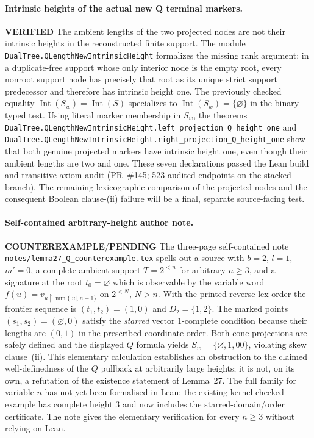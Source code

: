 \documentclass[11pt]{article}
\newcommand{\ok}{\textcolor{green!40!black}{\textbf{VERIFIED}}}
\newcommand{\bad}{\textcolor{red!70!black}{\textbf{COUNTEREXAMPLE}}}
\newcommand{\todo}{\textcolor{gray!70!black}{\textbf{PENDING}}}
\newcommand{\lean}[1]{\texttt{#1}}
\begin{document}
\paragraph{Intrinsic heights of the actual new Q terminal markers.} \ok
The ambient lengths of the two projected nodes are not their
intrinsic heights in the reconstructed finite support.
The module \lean{DualTree.QLengthNewIntrinsicHeight}
formalizes the missing rank argument: in a duplicate-free
support whose only interior node is the empty root, every
nonroot support node has precisely that root as its unique
strict support predecessor and therefore has intrinsic height
one. The previously checked equality
$\operatorname{Int}(S_w)=\operatorname{Int}(S)$ specializes to
$\operatorname{Int}(S_w)=\{\varnothing\}$ in the binary typed
test. Using literal marker membership in $S_w$, the theorems
\lean{DualTree.QLengthNewIntrinsicHeight.left_projection_Q_height_one}
and \lean{DualTree.QLengthNewIntrinsicHeight.right_projection_Q_height_one}
show that both genuine projected markers have intrinsic
height one, even though their ambient lengths are two and one.
These seven declarations passed the Lean build and transitive axiom
audit (PR~\#145; 523 audited endpoints on the stacked branch). The remaining lexicographic comparison of the
projected nodes and the consequent Boolean clause-(ii)
failure will be a final, separate source-facing test.

\paragraph{Self-contained arbitrary-height author note.} \bad/\todo
The three-page self-contained note
\texttt{notes/lemma27\_Q\_counterexample.tex}
spells out a source with $b=2$, $l=1$, $m'=0$, a complete
ambient support $T=2^{<n}$ for arbitrary $n\ge3$, and a
signature at the root $t_0=\varnothing$ which is observable
by the variable word $f(u)=v_{u\upharpoonright\min\{|u|,n-1\}}$
on $2^{<N}$, $N>n$. With the printed reverse-lex order the
frontier sequence is $(t_1,t_2)=(1,0)$ and $D_2=\{1,2\}$.
The marked points $(s_1,s_2)=(\varnothing,0)$ satisfy the
\emph{starred} vector $1$-complete condition because their
lengths are $(0,1)$ in the prescribed coordinate order.
Both cone projections are safely defined and the displayed
$Q$ formula yields $S_w=\{\varnothing,1,00\}$, violating
skew clause~(ii).
This elementary calculation establishes an obstruction to the
claimed well-definedness of the $Q$ pullback at arbitrarily
large heights; it is not, on its own, a refutation of the
existence statement of Lemma~27.
The full family for variable $n$ has not yet been formalised
in Lean; the existing kernel-checked example has complete
height $3$ and now includes the starred-domain/order
certificate. The note gives the elementary verification
for every $n\ge3$ without relying on Lean.
\end{document}
